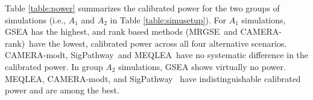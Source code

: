 \documentclass[a4,center,fleqn]{NAR}
\newcommand{\OurMethod}{MEQLEA}
\newcommand{\aaCase}{a}
\newcommand{\CMR}{CAMERA-rank}
\newcommand{\CMT}{CAMERA-modt}
\newcommand{\gent}{SigPathway}
\newcommand{\genr}{MRGSE}
\begin{document}
	Table \ref{table:power} summarizes the calibrated power for the two groups of simulations (i.e.,
	$A_1$ and $A_2$ in Table \ref{table:simusetup}). %
	For $A_1$ simulations, GSEA has the highest, and rank based methods (\genr~and \CMR)~have the
	lowest, calibrated power across all four alternative scenarios. \CMT, \gent~and \OurMethod~have no
	systematic difference in the calibrated power. %
	In group $A_2$ simulations, GSEA shows virtually no power. \OurMethod, \CMT, and \gent~ have
	indistinguishable calibrated power and are among the best.
	
\end{document}
